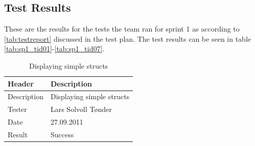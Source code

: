 \subsection{Test Results}
These are the results for the tests the team ran for sprint 1 as according to \autoref{tab:testreport} discussed in the test plan.
The test results can be seen in table \ref{tab:sp1_tid01}-\ref{tab:sp1_tid07}.
\begin{table}[!htb] \footnotesize \center
\caption{Supporting parameters for c-header file \label{tab:sp1_tid01}}
\noindent{}
\end{table}

\begin{table}[!htb] \footnotesize \center
\caption{Supporting basic data types \label{tab:sp1_tid02}}
\noindent{}
\end{table}

\begin{table}[!htb] \footnotesize \center
\caption{Displaying simple structs  \label{tab:sp1_tid03}}
\begin{tabular}{l l}
	\toprule
	Header & Description \\
	\midrule
	Description & Displaying simple structs \\
	Tester & Lars Solvoll Tønder \\
	Date & 27.09.2011 \\
	Result & Success\\
	\bottomrule
\end{tabular}
\end{table}

